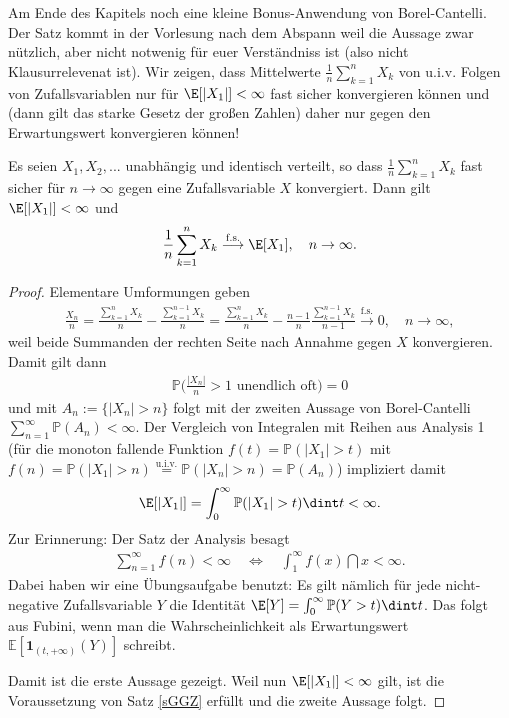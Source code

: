 Am Ende des Kapitels noch eine kleine Bonus-Anwendung von Borel-Cantelli. Der Satz kommt in der Vorlesung nach dem Abspann weil die Aussage zwar n\"utzlich, aber nicht notwenig f\"ur euer Verst\"andniss ist (also nicht Klausurrelevenat ist). Wir zeigen, dass Mittelwerte $\frac 1 n \sum_{k=1}^n X_k$ von u.i.v. Folgen von Zufallsvariablen nur f\"ur $\E[|X_1|]<\infty$ fast sicher konvergieren k\"onnen und (dann gilt das starke Gesetz der gro\ss en Zahlen) daher nur gegen den Erwartungswert konvergieren k\"onnen!
\begin{satz}\label{zusatz}
	Es seien $X_1,X_2,...$ unabh\"angig und identisch verteilt, so dass $\frac 1 n \sum_{k=1}^n X_k$ fast sicher f\"ur $n\to\infty$ gegen eine Zufallsvariable $X$ konvergiert. Dann gilt $\E[|X_1|]<\infty$ und 
	\begin{align*}
		\frac 1 n \sum_{k=1}^n X_k \overset{\text{f.s.}}{\longrightarrow} \E[X_1],\quad n\to\infty.
	\end{align*}	 
\end{satz}
\begin{proof}
Elementare Umformungen geben
\begin{align*}
	\frac{X_n}{n}=\frac{\sum_{k=1}^n X_k}{n}-\frac{\sum_{k=1}^{n-1}X_k}{n}= \frac{\sum_{k=1}^nX_k}{n}-\frac{n-1}{n} \frac{\sum_{k=1}^{n-1}X_k}{n-1}\overset{\text{f.s.}}{\to} 0,\quad n\to \infty,
\end{align*}
weil beide Summanden der rechten Seite nach Annahme gegen $X$ konvergieren. Damit gilt dann 
\begin{align*}
	\mathbb P\Big(\frac{|X_n|}{n}>1\text{ unendlich oft}\Big)=0
\end{align*}
und mit $A_n:=\{|X_n|>n\}$ folgt mit der zweiten Aussage von Borel-Cantelli $\sum_{n=1}^\infty \mathbb P(A_n)<\infty.$ Der Vergleich von Integralen mit Reihen aus Analysis 1 (f\"ur die monoton fallende Funktion $f(t)=\mathbb P(|X_1|>t)$ mit $f(n)=\mathbb P(|X_1|>n)\overset{\text{u.i.v.}}{=}\mathbb P(|X_n|>n)=\mathbb P(A_n)$) impliziert damit 
\begin{align*}
	\E[|X_1|]=\int_0^\infty \mathbb P(|X_1|>t)\dint t<\infty.
\end{align*}
Zur Erinnerung: Der Satz der Analysis besagt
\begin{align*}
	\sum_{n=1}^\infty f(n)<\infty\quad \Leftrightarrow \quad \int_1^\infty f(x)\dint x<\infty.
\end{align*}
Dabei haben wir eine \"Ubungsaufgabe benutzt: Es gilt n\"amlich f\"ur jede nicht-negative Zufallsvariable $Y$ die Identit\"at $\E[Y]=\int_0^\infty \mathbb P(Y>t)\dint t$. Das folgt aus Fubini, wenn man die Wahrscheinlichkeit als Erwartungswert $\mathbb E[\mathbf{1}_{(t,+\infty)}(Y)]$ schreibt.\smallskip


Damit ist die erste Aussage gezeigt. Weil nun $\E[|X_1|]<\infty$ gilt, ist die Voraussetzung von Satz \ref{sGGZ} erf\"ullt und die zweite Aussage folgt.
\end{proof}
\marginpar{\textcolor{red}{Vorlesung 27}}

